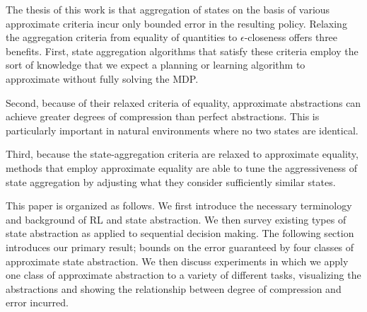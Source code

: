The thesis of this work is that aggregation of states on the basis of various approximate criteria incur only bounded error in the resulting policy. Relaxing the aggregation criteria from equality of quantities to $\epsilon$-closeness offers three benefits. First, state aggregation algorithms that satisfy these criteria employ the sort of knowledge that we expect a planning or learning algorithm to approximate without fully solving the \ac{MDP}. 

Second, because of their relaxed criteria of equality, approximate abstractions can achieve greater degrees of compression than perfect abstractions. This is particularly important in natural environments where no two states are identical.


Third, because the state-aggregation criteria are relaxed to approximate equality, methods that employ approximate equality are able to tune the aggressiveness of state aggregation by adjusting what they consider sufficiently similar states.


This paper is organized as follows. We first introduce the necessary terminology and background of \ac{RL} and state abstraction. We then survey existing types of state abstraction as applied to sequential decision making. The following section introduces our primary result; bounds on the error guaranteed by four classes of approximate state abstraction. We then discuss experiments in which we apply one class of approximate abstraction to a variety of different tasks, visualizing the abstractions and showing the relationship between degree of compression and error incurred.

